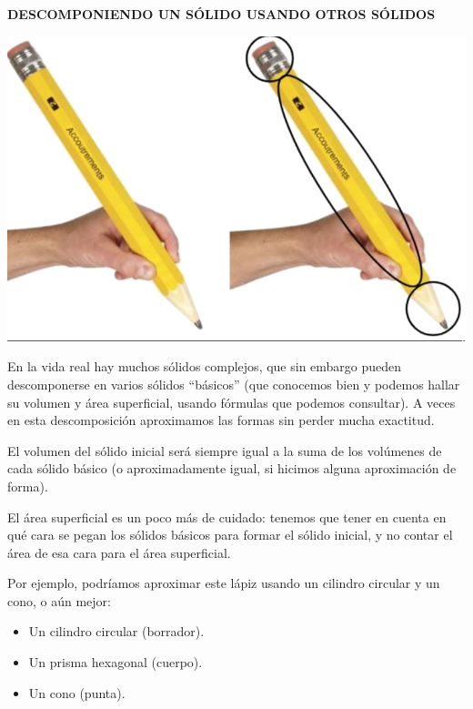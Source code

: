 \documentclass[12pt,a4paper]{article}
\begin{document}
\begin{tcolorbox}[colback=fondorosa, colframe=rojoclaro, title=\textbf{Mini-explicación: Descomponiendo un sólido usando otros sólidos}, breakable]
\textbf{DESCOMPONIENDO UN SÓLIDO USANDO OTROS SÓLIDOS}

\begin{multicols}{2}
	\includegraphics[width=\linewidth]{Figuras/fig27.png}
	
En la vida real hay muchos sólidos complejos, que sin embargo pueden descomponerse en varios sólidos ``básicos'' (que conocemos bien y podemos hallar su volumen y área superficial, usando fórmulas que podemos consultar). A veces en esta descomposición aproximamos las formas sin perder mucha exactitud.

El volumen del sólido inicial será siempre igual a la suma de los volúmenes de cada sólido básico (o aproximadamente igual, si hicimos alguna aproximación de forma).

El área superficial es un poco más de cuidado: tenemos que tener en cuenta en qué cara se pegan los sólidos básicos para formar el sólido inicial, y no contar el área de esa cara para el área superficial.

Por ejemplo, podríamos aproximar este lápiz usando un cilindro circular y un cono, o aún mejor:

\vspace{3mm}

\begin{itemize}[nosep, leftmargin=*]
  \item Un cilindro circular (borrador).
  \item Un prisma hexagonal (cuerpo).
  \item Un cono (punta).
\end{itemize}
\end{multicols}

\vspace{2mm}
\end{tcolorbox}
\end{document}
